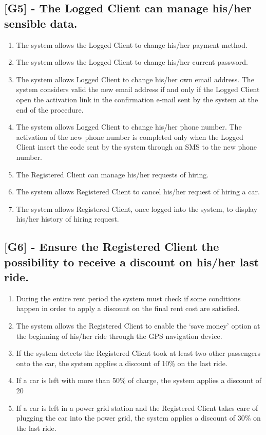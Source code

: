 \subsection{[G5] - The Logged Client can manage his/her sensible data.}
\begin{enumerate}[label=\textbf{R5.\arabic*)}]
\item The system allows the Logged Client to change his/her payment method.
\item The system allows the Logged Client to change his/her current password.
\item The system allows Logged Client to change his/her own email address. The system considers valid the new email address if and only if the Logged Client open the activation link in the confirmation e-mail sent by the system at the end of the procedure.
\item The system allows Logged Client to change his/her phone number. The activation of the new phone number is completed only when the Logged Client insert the code sent by the system through an SMS to the new phone number.
\item The Registered Client can manage his/her requests of hiring.
\item The system allows Registered Client to cancel his/her request of hiring a car.
\item The system allows Registered Client, once logged into the system, to display his/her history of hiring request.
\end{enumerate}

\subsection{[G6] - Ensure the Registered Client the possibility to receive a discount on his/her last ride.}
\begin{enumerate}[label=\textbf{R6.\arabic*)}]
\item During the entire rent period the system must check if some conditions happen in order to apply a discount on the final rent cost are satisfied.
\item The system allows the Registered Client to enable the ‘save money’ option at the beginning of his/her ride through the GPS navigation device.
\item If the system detects the Registered Client took at least two other passengers onto the car, the system applies a discount of 10\% on the last ride.
\item If a car is left with more than 50\% of charge, the system applies a discount of 20%
\item If a car is left in a power grid station and the Registered Client takes care of plugging the car into the power grid, the system applies a discount of 30\% on the last ride.

\end{enumerate}

